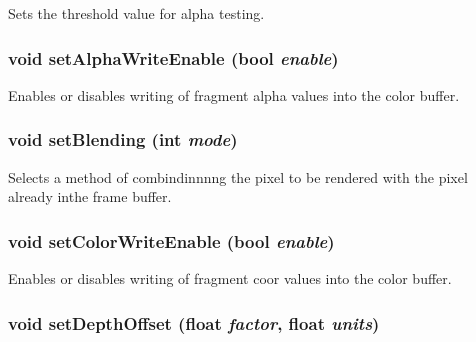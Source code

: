 Sets the threshold value for alpha testing. \hypertarget{classm3g_1_1CompositingMode_5204f1acac056f82d322262703be67b0}{
\subsubsection[{setAlphaWriteEnable}]{\setlength{\rightskip}{0pt plus 5cm}void setAlphaWriteEnable (bool {\em enable})}}
\label{classm3g_1_1CompositingMode_5204f1acac056f82d322262703be67b0}


Enables or disables writing of fragment alpha values into the color buffer. \hypertarget{classm3g_1_1CompositingMode_4c09465dfec9efa000c115c5c2867b63}{
\subsubsection[{setBlending}]{\setlength{\rightskip}{0pt plus 5cm}void setBlending (int {\em mode})}}
\label{classm3g_1_1CompositingMode_4c09465dfec9efa000c115c5c2867b63}


Selects a method of combindinnnng the pixel to be rendered with the pixel already inthe frame buffer. \hypertarget{classm3g_1_1CompositingMode_84f7cba08f5a2bea05de4fc3154a50b2}{
\subsubsection[{setColorWriteEnable}]{\setlength{\rightskip}{0pt plus 5cm}void setColorWriteEnable (bool {\em enable})}}
\label{classm3g_1_1CompositingMode_84f7cba08f5a2bea05de4fc3154a50b2}


Enables or disables writing of fragment coor values into the color buffer. \hypertarget{classm3g_1_1CompositingMode_4c825055ad0b5910ef4f9136d9a8e588}{
\subsubsection[{setDepthOffset}]{\setlength{\rightskip}{0pt plus 5cm}void setDepthOffset (float {\em factor}, \/  float {\em units})}}
\label{classm3g_1_1CompositingMode_4c825055ad0b5910ef4f9136d9a8e588}


